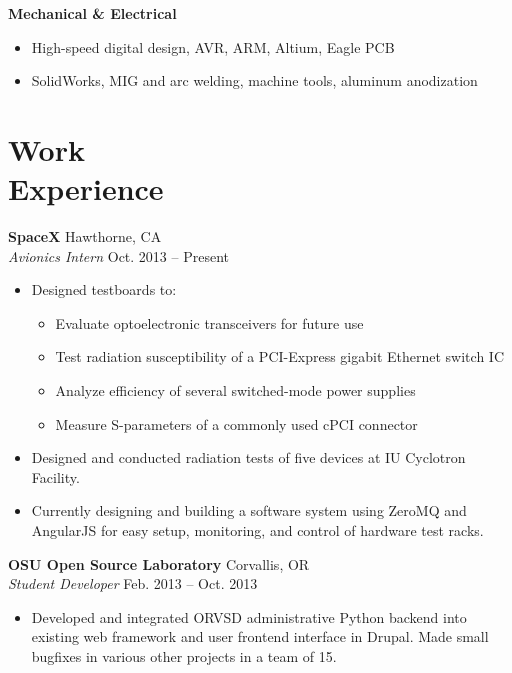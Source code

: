 \documentclass[10pt,letterpaper,margin]{res}
\begin{document}
\begin{resume}
{\bf Mechanical \& Electrical}\vspace{0.2em}

\begin{itemize}
	\item High-speed digital design, AVR, ARM, Altium, Eagle PCB
	\item SolidWorks, MIG and arc welding, machine tools, aluminum anodization
\end{itemize}



\section{Work \\ Experience}

{\bf SpaceX} \hfill {\color{lightgray} Hawthorne, CA} \\
{\it Avionics Intern} \hfill {\color{lightgray} Oct. 2013 -- Present}\vspace{0.2em}

\begin{itemize}
	\item Designed testboards to:
		\begin{itemize}
			\item Evaluate optoelectronic transceivers for future use
			\item Test radiation susceptibility of a PCI-Express gigabit Ethernet switch IC
			\item Analyze efficiency of several switched-mode power supplies
			\item Measure S-parameters of a commonly used cPCI connector
		\end{itemize}
	\item Designed and conducted radiation tests of five devices at IU
		Cyclotron Facility.
	\item Currently designing and building a software system using ZeroMQ and
		AngularJS for easy setup, monitoring, and control of hardware test
		racks.
\end{itemize}


{\bf OSU Open Source Laboratory} \hfill {\color{lightgray} Corvallis, OR} \\
{\it Student Developer} \hfill {\color{lightgray} Feb. 2013 -- Oct. 2013}\vspace{0.2em}

\begin{itemize}
	\item Developed and integrated ORVSD administrative Python backend into
		existing web framework and user frontend interface in Drupal. Made
		small bugfixes in various other projects in a team of 15.
\end{itemize}



\end{resume}
\end{document}
